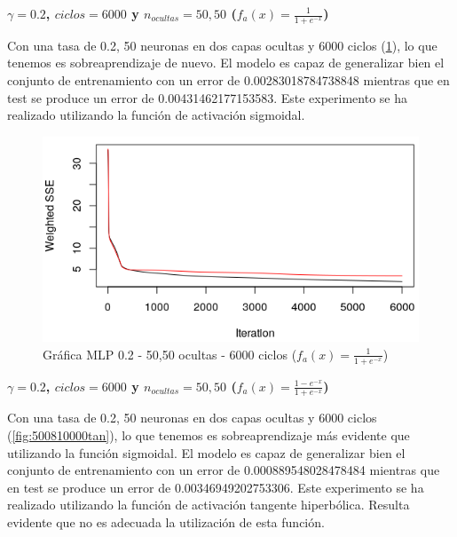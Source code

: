 \documentclass[11pt,spanish,listoffigures,listoftables]{workluis}
\begin{document}
\par \textbf{$\gamma = 0.2$, $ciclos = 6000$ y $n_{ocultas} = 50, 50$ ($f_{a}(x) = \frac{1}{1+e^{-x}}$)}

\par Con una tasa de 0.2, 50 neuronas en dos capas ocultas y 6000 ciclos (\ref{fig:5050026000sig}), lo que tenemos es sobreaprendizaje de nuevo. El modelo es capaz de generalizar bien el conjunto de entrenamiento con un error de 0.00283018784738848 mientras que en test se produce un error de 0.00431462177153583. Este experimento se ha realizado utilizando la función de activación sigmoidal.

\begin{figure}[H]
\centering
\includegraphics[scale=0.5]{5050026000sig}
\caption{Gráfica MLP 0.2 - 50,50 ocultas - 6000 ciclos ($f_{a}(x) = \frac{1}{1+e^{-x}}$)}\label{fig:5050026000sig}
\end{figure}

\par \textbf{$\gamma = 0.2$, $ciclos = 6000$ y $n_{ocultas} = 50, 50$ ($f_{a}(x) = \frac{1-e^{-x}}{1+e^{-x}}$)}

\par Con una tasa de 0.2, 50 neuronas en dos capas ocultas y 6000 ciclos (\ref{fig:500810000tan}), lo que tenemos es sobreaprendizaje más evidente que utilizando la función sigmoidal. El modelo es capaz de generalizar bien el conjunto de entrenamiento con un error de 0.000889548028478484 mientras que en test se produce un error de 0.00346949202753306. Este experimento se ha realizado utilizando la función de activación tangente hiperbólica. Resulta evidente que no es adecuada la utilización de esta función.
\end{document}
